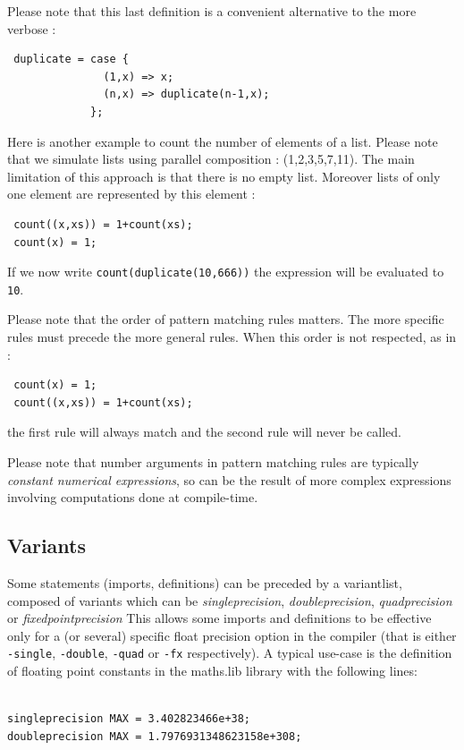 Please note that this last definition is a convenient alternative to the more verbose :
\begin{lstlisting}
 duplicate = case { 
               (1,x) => x; 
               (n,x) => duplicate(n-1,x); 
             };
\end{lstlisting}

Here is another example to count the number of elements of a list. Please note that we simulate lists using parallel composition : (1,2,3,5,7,11). The main limitation of this approach is that there is no empty list. Moreover lists of only one element are represented by this element :
\begin{lstlisting}
 count((x,xs)) = 1+count(xs);
 count(x) = 1;
\end{lstlisting}

If we now write \lstinline'count(duplicate(10,666))' the expression will be evaluated to \lstinline'10'.

Please note that the order of pattern matching rules matters. The more specific rules must precede the more general rules. When this order is not respected, as in :
\begin{lstlisting}
 count(x) = 1;
 count((x,xs)) = 1+count(xs);
\end{lstlisting}
the first rule will always match and the second rule will never be called.

Please note that number arguments in pattern matching rules are typically \textit{constant numerical expressions}, so can be the result of more complex expressions involving computations done at compile-time.

\subsection{Variants}

Some statements (imports, definitions) can be preceded by a variantlist, composed of variants which can be \textit{singleprecision}, \textit{doubleprecision}, \textit{quadprecision} or \textit{fixedpointprecision} This allows some imports and definitions to be effective only for a (or several) specific float precision option in the compiler (that is either \lstinline'-single', \lstinline'-double', \lstinline'-quad' or \lstinline'-fx' respectively). A typical use-case is the definition of floating point constants in the maths.lib library with the following lines:

\begin{lstlisting}

singleprecision MAX = 3.402823466e+38;
doubleprecision MAX = 1.7976931348623158e+308;

\end{lstlisting}

